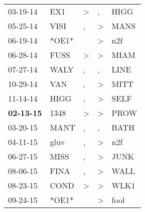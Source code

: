 \begin{supertabular}{p{0.07\textwidth}p{0.06\textwidth}p{0.02\textwidth}p{0.02\textwidth}p{0.06\textwidth}}
          03-19-14\textsuperscript{} &            EX1\textsuperscript{} &     \textgreater &                , &           HIGG\textsuperscript{} \\
          05-25-14\textsuperscript{} &           VISI\textsuperscript{} &                , &     \textgreater &           MANS\textsuperscript{} \\
          06-19-14\textsuperscript{} &                            *OE1* &                  &     \textgreater &            n2f\textsuperscript{} \\
          06-28-14\textsuperscript{} &           FUSS\textsuperscript{} &     \textgreater &     \textgreater &           MIAM\textsuperscript{} \\
          07-27-14\textsuperscript{} &           WALY\textsuperscript{} &                , &                , &           LINE\textsuperscript{} \\
          10-29-14\textsuperscript{} &            VAN\textsuperscript{} &                , &     \textgreater &           MITT\textsuperscript{} \\
          11-14-14\textsuperscript{} &           HIGG\textsuperscript{} &                , &     \textgreater &           SELF\textsuperscript{} \\
 \textbf{02-13-15\textsuperscript{}} &           1348\textsuperscript{} &     \textgreater &     \textgreater &           PROW\textsuperscript{} \\
          03-20-15\textsuperscript{} &           MANT\textsuperscript{} &                , &                , &           BATH\textsuperscript{} \\
          04-11-15\textsuperscript{} &           gluv\textsuperscript{} &                , &     \textgreater &            n2f\textsuperscript{} \\
          06-27-15\textsuperscript{} &           MISS\textsuperscript{} &                , &     \textgreater &           JUNK\textsuperscript{} \\
          08-06-15\textsuperscript{} &           FINA\textsuperscript{} &                , &     \textgreater &           WALL\textsuperscript{} \\
          08-23-15\textsuperscript{} &           COND\textsuperscript{} &     \textgreater &     \textgreater &           WLK1\textsuperscript{} \\
          09-24-15\textsuperscript{} &                            *OE1* &                  &     \textgreater &           fool\textsuperscript{} \\

\end{supertabular}
